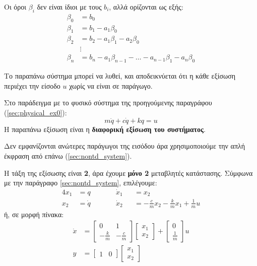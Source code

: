 \documentclass[11pt,a4paper,notitlepage,fleqn]{article}
\begin{document}
\begin{itemize}
     Οι όροι \( \beta_i \) δεν είναι ίδιοι με τους \( b_i \), αλλά ορίζονται ως εξής:
     \begin{align*}
     	\beta_0 &= b_0 \\
     	\beta_1 &= b_1 - a_1\beta_0\\
     	\beta_2 &= b_2 - a_1\beta_1 - a_2\beta_0\\
     	&\vdots\\
     	\beta_n &= b_n - a_1\beta_{n-1}-\dots - a_{n-1}\beta_1 - a_n\beta_0
     \end{align*}
     
     Το παραπάνω σύστημα μπορεί να λυθεί, και αποδεικνύεται ότι η κάθε εξίσωση περιέχει
     την είσοδο \( u \) χωρίς να είναι σε παράγωγο.
\end{itemize}

\begin{exercise}[Παράδειγμα]
	Στο παράδειγμα με το φυσικό σύστημα της προηγούμενης παραγράφου (\autoref{sec:physical_ex0}):
	\[
	m\ddot q + c\dot q + kq = u
	\]
	\tcblower
	Η παραπάνω εξίσωση είναι η \textbf{διαφορική εξίσωση του συστήματος}.
	
	Δεν εμφανίζονται ανώτερες παράγωγοι της εισόδου άρα χρησιμοποιούμε την απλή έκφραση
	από επάνω (\autoref{sec:nontd_system}).
	
	Η τάξη της εξίσωσης είναι \textbf{2}, άρα έχουμε \textbf{μόνο 2} μεταβλητές κατάστασης.
	Σύμφωνα με την παράγραφο \autoref{sec:nontd_system}, επιλέγουμε:
	\begin{alignat*}{4}
		x_1 &=q \qquad && \dot x_1&&=x_2 \\
		x_2&=\dot q \qquad && \dot x_2 &&= -\frac{c}{m}x_2 - \frac{k}{m}x_1
		+ \frac{1}{m}u
	\end{alignat*}
	ή, σε μορφή πίνακα:
	\begin{align*}
		\dot x &= \left[\begin{matrix}
		0 & 1 \\ -\frac{k}{m} & -\frac{c}{m}
		\end{matrix}\right]\left[\begin{matrix}
		x_1\\x_2
		\end{matrix}
		\right]+\left[\begin{matrix}
		0\\ \frac{1}{m}
		\end{matrix}\right]u\\
		y &= \left[\begin{matrix}
		1 & 0
		\end{matrix}\right]\left[\begin{matrix}
		x_1 \\ x_2
		\end{matrix}\right]
	\end{align*}
\end{exercise}
\end{document}
